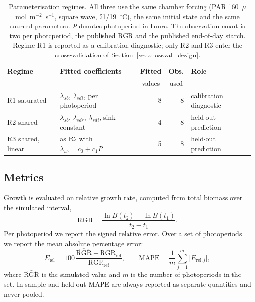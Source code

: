 \begin{table}[!htbp]
\centering
\small
\caption{Parameterisation regimes. All three use the same chamber forcing
(PAR 160~$\mu$mol~m$^{-2}$~s$^{-1}$, square wave, 21/19~$^\circ$C), the same
initial state and the same sourced parameters. $P$ denotes photoperiod in
hours. The observation count is two per photoperiod, the published RGR and the
published end-of-day starch. Regime R1 is reported as a calibration diagnostic;
only R2 and R3 enter the cross-validation of
Section~\ref{sec:crossval_design}.}
\label{tab:scenarios}
\begin{tabular}{@{}llrrl@{}}
\toprule
\textbf{Regime} & \textbf{Fitted coefficients} & \textbf{Fitted} &
\textbf{Obs.} & \textbf{Role} \\
 & & \multicolumn{1}{c}{\footnotesize values} &
\multicolumn{1}{c}{\footnotesize used} & \\
\midrule
R1 saturated & $\lambda_{sb}$, $\lambda_{sdi}$, per photoperiod & 8 & 8 &
calibration diagnostic \\
R2 shared & $\lambda_{sb}$, $\lambda_{sdr}$, $\lambda_{sdi}$, sink constant & 4
& 8 & held-out prediction \\
R3 shared, linear & as R2 with $\lambda_{sb}=c_0+c_1 P$ & 5 & 8 &
held-out prediction \\
\bottomrule
\end{tabular}
\end{table}

\subsection{Metrics}

Growth is evaluated on relative growth rate, computed from total biomass over
the simulated interval,
\begin{equation}
\mathrm{RGR} = \frac{\ln B(t_2) - \ln B(t_1)}{t_2 - t_1} .
\label{eq:rgr}
\end{equation}
Per photoperiod we report the signed relative error. Over a set of photoperiods
we report the mean absolute percentage error:
\begin{equation}
E_{\text{rel}}
= 100\,\frac{\widehat{\mathrm{RGR}} - \mathrm{RGR}_{\text{ref}}}
{\mathrm{RGR}_{\text{ref}}},
\qquad
\mathrm{MAPE} = \frac{1}{m}\sum_{j=1}^{m} \bigl| E_{\text{rel},j} \bigr| ,
\label{eq:rgr_error}
\end{equation}
where $\widehat{\mathrm{RGR}}$ is the simulated value and $m$ is the number of
photoperiods in the set. In-sample and held-out MAPE are always reported as
separate quantities and never pooled.

